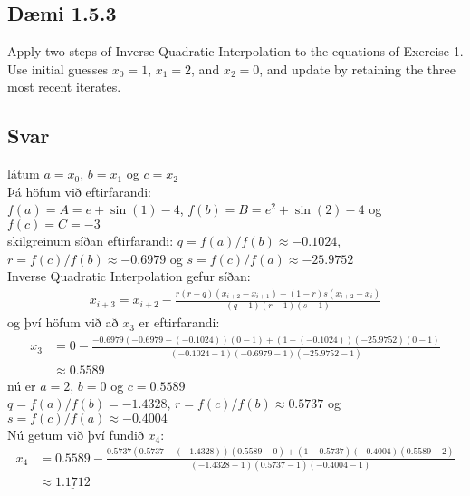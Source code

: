 \documentclass[11pt]{article}
\begin{document}
\newpage
\subsection*{Dæmi 1.5.3}
Apply two steps of Inverse Quadratic Interpolation to the equations of Exercise 1. Use initial
guesses $x_0 = 1$, $x_1=2$, and $x_2 = 0$, and update by retaining the three most recent iterates.
\subsection*{Svar}
látum $a = x_0$, $b=x_1$ og $c=x_2$\\
Þá höfum við eftirfarandi: \\
$f(a) = A = e+\sin(1)-4$, $f(b) = B = e^2 +\sin(2) -4$ og $f(c) = C = -3$\\
skilgreinum síðan eftirfarandi:
$q=f(a)/f(b) \approx -0.1024$, $r=f(c)/f(b)\approx -0.6979$ og $s=f(c)/f(a)\approx -25.9752$\\
Inverse Quadratic Interpolation gefur síðan:
\begin{align*}
x_{i+3} = x_{i+2}- \frac{r(r-q)(x_{i+2}-x_{i+1})+(1-r)s(x_{i+2}-x_i)}{(q-1)(r-1)(s-1)}
\end{align*}
og því höfum við að $x_3$ er eftirfarandi:
\begin{align*}
x_3 &= 0 - \frac{-0.6979(-0.6979 - (-0.1024))(0-1) + (1-(-0.1024))(-25.9752)(0-1)}{(-0.1024-1) (-0.6979-1) (-25.9752-1)} \\
	&\approx 0.5589
\end{align*}
nú er $a=2$, $b=0$ og $c=0.5589$\\
$q = f(a)/f(b) = -1.4328$, $r=f(c)/f(b)\approx 0.5737$ og $s=f(c)/f(a)\approx -0.4004$\\
Nú getum við því fundið $x_4$:
\begin{align*}
x_4 &= 0.5589 - \frac{0.5737(0.5737-(-1.4328))(0.5589-0)+(1-0.5737)(-0.4004)(0.5589-2)}{(-1.4328-1) (0.5737-1) (-0.4004-1)}\\
	&\approx \underline{1.1712} 
\end{align*}
\end{document}
